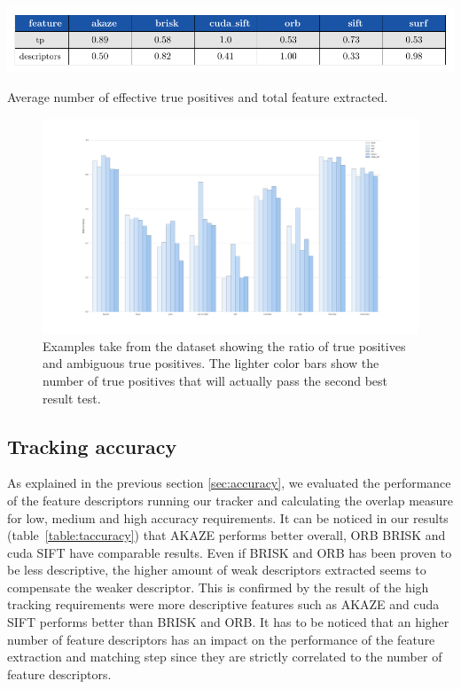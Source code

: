 \begin{table}[h]
\centerline{%
		\includegraphics[width=0.98\linewidth]{tables/descriptivness_ratio.pdf}}
    \vspace{-2mm} 
	\caption{Average number of effective true positives and total feature extracted.}
	\label{table:tp_ratio}
\end{table}


\begin{figure}[t]
\centerline{%
		\includegraphics[width=0.98\linewidth]{imgs/false_positives.pdf}}
    \vspace{-2mm} 
	\caption{Examples take from the dataset showing the ratio of true positives and ambiguous true positives. The lighter color bars show the number of true positives that will actually pass the second best result test.}
	\label{fig:false_positives}
\end{figure}


\subsection{Tracking accuracy}

As explained in the previous section \ref{sec:accuracy}, we evaluated the performance of the feature descriptors running our tracker and calculating the overlap measure for low, medium and high accuracy requirements. It can be noticed in our results (table~\ref{table:taccuracy}) that AKAZE performs better overall, ORB BRISK and cuda SIFT have comparable results. Even if BRISK and ORB has been proven to be less descriptive, the higher amount of weak descriptors extracted seems to compensate the weaker descriptor. This is confirmed by the result of the high tracking requirements were more descriptive features such as AKAZE and cuda SIFT performs better than BRISK and ORB. It has to be noticed that an higher number of feature descriptors has an impact on the performance of the feature extraction and matching step since they are strictly correlated to the number of feature descriptors. 

